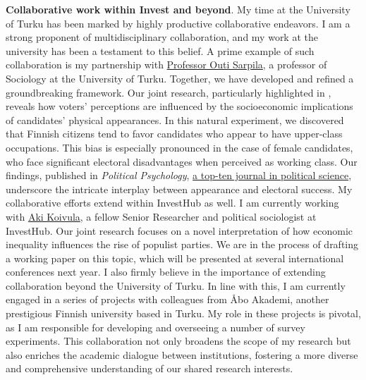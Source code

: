 \documentclass[10pt,stdletter,dateno,sigleft]{newlfm} %
\begin{document}
\begin{newlfm}
{\bf Collaborative work within Invest and beyond}. My time at the University of Turku has been marked by highly productive collaborative endeavors. I am a strong proponent of multidisciplinary collaboration, and my work at the university has been a testament to this belief. A prime example of such collaboration is my partnership with \href{https://www.utu.fi/en/people/outi-sarpila Outi Sarpila}{Professor Outi Sarpila}, a professor of Sociology at the University of Turku. Together, we have developed and refined a groundbreaking framework. Our joint research, particularly highlighted in \textcite{Bahamonde:2023}, reveals how voters' perceptions are influenced by the socioeconomic implications of candidates' physical appearances. In this natural experiment, we discovered that Finnish citizens tend to favor candidates who appear to have upper-class occupations. This bias is especially pronounced in the case of female candidates, who face significant electoral disadvantages when perceived as working class. Our findings, published in \emph{Political Psychology}, \href{https://www.scimagojr.com/journalrank.php?category=3320}{a top-ten journal in political science}, underscore the intricate interplay between appearance and electoral success. My collaborative efforts extend within InvestHub as well. I am currently working with \href{https://www.utu.fi/en/people/aki-koivula}{Aki Koivula}, a fellow Senior Researcher and political sociologist at InvestHub. Our joint research focuses on a novel interpretation of how economic inequality influences the rise of populist parties. We are in the process of drafting a working paper on this topic, which will be presented at several international conferences next year. I also firmly believe in the importance of extending collaboration beyond the University of Turku. In line with this, I am currently engaged in a series of projects with colleagues from \AA bo Akademi, another prestigious Finnish university based in Turku. My role in these projects is pivotal, as I am responsible for developing and overseeing a number of survey experiments. This collaboration not only broadens the scope of my research but also enriches the academic dialogue between institutions, fostering a more diverse and comprehensive understanding of our shared research interests.

\newpage


\end{newlfm}
\end{document}
